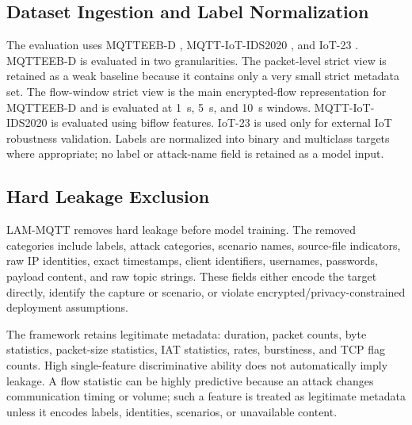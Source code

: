 \documentclass[lettersize,journal]{IEEEtran}
\begin{document}
\subsection{Dataset Ingestion and Label Normalization}
The evaluation uses MQTTEEB-D \cite{mqtteebd2025}, MQTT-IoT-IDS2020 \cite{hindy2020mqttiot}, and IoT-23 \cite{iot23}. MQTTEEB-D is evaluated in two granularities. The packet-level strict view is retained as a weak baseline because it contains only a very small strict metadata set. The flow-window strict view is the main encrypted-flow representation for MQTTEEB-D and is evaluated at 1~s, 5~s, and 10~s windows. MQTT-IoT-IDS2020 is evaluated using biflow features. IoT-23 is used only for external IoT robustness validation. Labels are normalized into binary and multiclass targets where appropriate; no label or attack-name field is retained as a model input.

\subsection{Hard Leakage Exclusion}
LAM-MQTT removes hard leakage before model training. The removed categories include labels, attack categories, scenario names, source-file indicators, raw IP identities, exact timestamps, client identifiers, usernames, passwords, payload content, and raw topic strings. These fields either encode the target directly, identify the capture or scenario, or violate encrypted/privacy-constrained deployment assumptions.

The framework retains legitimate metadata: duration, packet counts, byte statistics, packet-size statistics, IAT statistics, rates, burstiness, and TCP flag counts. High single-feature discriminative ability does not automatically imply leakage. A flow statistic can be highly predictive because an attack changes communication timing or volume; such a feature is treated as legitimate metadata unless it encodes labels, identities, scenarios, or unavailable content.
\end{document}
